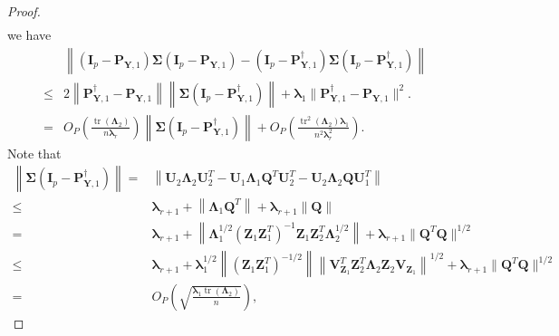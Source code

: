 \documentclass[12pt]{article} %
\DeclareMathOperator{\mytr}{tr}
\newcommand{\bQ}{\mathbf{Q}}
\newcommand{\bZ}{\mathbf{Z}}
\newcommand{\bP}{\mathbf{P}}
\newcommand{\bY}{\mathbf{Y}}
\newcommand{\bI}{\mathbf{I}}
\newcommand{\bU}{\mathbf{U}}
\newcommand{\bV}{\mathbf{V}}
\newcommand{\bfsym}[1]{\ensuremath{\boldsymbol{#1}}}
\def\blambda {\bfsym {\lambda}}
\def\bLambda {\bfsym {\Lambda}}
\def\bSigma {\bfsym {\Sigma}}
\theoremstyle{definition}
\begin{document}
\begin{appendices}
\begin{proof}
\begin{equation*}
\begin{split}
         \end{split}
         \end{equation*}
we have
         \begin{equation*}
         \begin{split}
         &\left\|
         (\bI_p-\bP_{\bY,1})
         \bSigma 
         (\bI_p-\bP_{\bY,1})
         -
         (\bI_p-\bP_{\bY,1}^{\dagger})
         \bSigma 
         (\bI_p-\bP_{\bY,1}^{\dagger})
         \right\|
         \\
         \leq&
         2
         \left\|\bP_{\bY,1}^{\dagger}-\bP_{\bY,1}\right\|
         \left\|\bSigma 
         (\bI_p-\bP_{\bY,1}^{\dagger})\right\|
         +
         \blambda_1\|\bP_{\bY,1}^{\dagger}-\bP_{\bY,1}\|^2.
         \\
         = &
         O_P\left(\frac{\mytr(\bLambda_2)}{n\blambda_r}\right)
         \left\|\bSigma 
         (\bI_p-\bP_{\bY,1}^{\dagger})\right\|
         +
         O_P\left(\frac{\mytr^2(\bLambda_2)\blambda_1}{n^2\blambda_r^2}\right)
         .
         \end{split}
         \end{equation*}
Note that
\begin{equation*}
    \begin{split}
         \left\|\bSigma 
         (\bI_p-\bP_{\bY,1}^{\dagger})\right\|
         =&
         \left\|
         \bU_2 \bLambda_2 \bU_2^T
         -\bU_1 \bLambda_1 \bQ^T \bU_2^T
         -\bU_2 \bLambda_2 \bQ \bU_1^T
         \right\|
         \\
         \leq &
         \blambda_{r+1}
         +
         \left\|
          \bLambda_1 \bQ^T
          \right\|
          +
          \blambda_{r+1}
          \left\|
          \bQ 
         \right\|
         \\
         = &
         \blambda_{r+1}
         +
         \left\|
         \bLambda_1^{1/2} (\bZ_1 \bZ_1^T)^{-1} \bZ_1 \bZ_2^T \bLambda_2^{1/2}
         \right\|
         +
         \blambda_{r+1}\|\bQ^T \bQ\|^{1/2}
         \\
         \leq &
         \blambda_{r+1}
         +
         \blambda_1^{1/2}
         \left\|
        (\bZ_1 \bZ_1^T)^{-1/2}
         \right\|
         \left\|
         \bV_{\bZ_1}^T \bZ_2^T \bLambda_2 \bZ_2 \bV_{\bZ_1}
         \right\|^{1/2}
         +
         \blambda_{r+1}\|\bQ^T \bQ\|^{1/2}
         \\
         =&
         O_P\left(\sqrt{\frac{\blambda_1\mytr(\bLambda_2)}{n}}\right),
    \end{split}

\end{equation*}
\end{proof}
\end{appendices}
\end{document}
